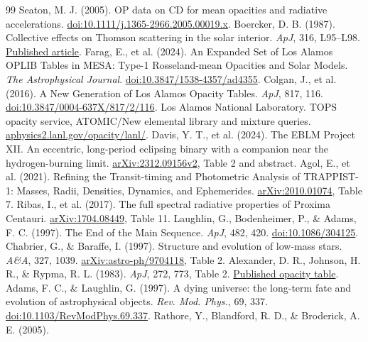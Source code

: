 \documentclass[11pt,letterpaper]{article}
\begin{document}
\begin{thebibliography}{99}
 Seaton, M. J. (2005).
OP data on CD for mean opacities and radiative accelerations.
\href{https://doi.org/10.1111/j.1365-2966.2005.00019.x}{doi:10.1111/j.1365-2966.2005.00019.x}.
 Boercker, D. B. (1987).
Collective effects on Thomson scattering in the solar interior.
\emph{ApJ}, 316, L95--L98.
\href{https://articles.adsabs.harvard.edu/pdf/1987ApJ...316L..95B}{Published article}.
 Farag, E., et al. (2024).
An Expanded Set of Los Alamos OPLIB Tables in MESA:
Type-1 Rosseland-mean Opacities and Solar Models.
\textit{The Astrophysical Journal}.
\href{https://doi.org/10.3847/1538-4357/ad4355}{doi:10.3847/1538-4357/ad4355}.
 Colgan, J., et al. (2016).
A New Generation of Los Alamos Opacity Tables. \textit{ApJ}, 817, 116.
\href{https://doi.org/10.3847/0004-637X/817/2/116}{doi:10.3847/0004-637X/817/2/116}.
 Los Alamos National Laboratory. TOPS opacity service,
ATOMIC/New elemental library and mixture queries.
\href{https://aphysics2.lanl.gov/opacity/lanl/}{aphysics2.lanl.gov/opacity/lanl/}.
 Davis, Y. T., et al. (2024).
The EBLM Project XII. An eccentric, long-period eclipsing binary with a companion
near the hydrogen-burning limit.
\href{https://arxiv.org/pdf/2312.09156v2}{arXiv:2312.09156v2}, Table 2 and abstract.
 Agol, E., et al. (2021).
Refining the Transit-timing and Photometric Analysis of TRAPPIST-1:
Masses, Radii, Densities, Dynamics, and Ephemerides.
\href{https://arxiv.org/pdf/2010.01074}{arXiv:2010.01074}, Table 7.
 Ribas, I., et al. (2017).
The full spectral radiative properties of Proxima Centauri.
\href{https://arxiv.org/pdf/1704.08449}{arXiv:1704.08449}, Table 11.
 Laughlin, G., Bodenheimer, P., \& Adams, F. C. (1997).
The End of the Main Sequence. \emph{ApJ}, 482, 420.
\href{https://doi.org/10.1086/304125}{doi:10.1086/304125}.
 Chabrier, G., \& Baraffe, I. (1997).
Structure and evolution of low-mass stars. \emph{A\&A}, 327, 1039.
\href{https://arxiv.org/abs/astro-ph/9704118}{arXiv:astro-ph/9704118}, Table 2.
 Alexander, D. R., Johnson, H. R., \& Rypma, R. L. (1983).
\emph{ApJ}, 272, 773, Table 2.
\href{https://adsabs.harvard.edu/pdf/1983ApJ...272..773A}{Published opacity table}.
 Adams, F. C., \& Laughlin, G. (1997).
A dying universe: the long-term fate and evolution of astrophysical objects.
\emph{Rev. Mod. Phys.}, 69, 337.
\href{https://doi.org/10.1103/RevModPhys.69.337}{doi:10.1103/RevModPhys.69.337}.
 Rathore, Y., Blandford, R. D., \& Broderick, A. E. (2005).

\end{thebibliography}
\end{document}
